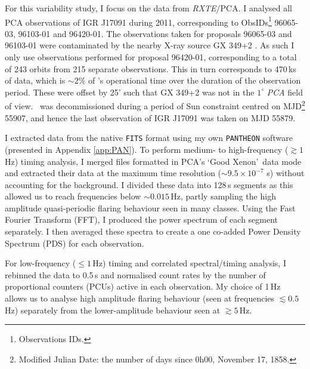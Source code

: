 \par For this variability study, I focus on the data from \indexrxte\indexpca\textit{RXTE}/PCA.  I analysed all PCA observations of IGR J17091 during 2011, corresponding to ObsIDs\footnote{Observations IDs.} 96065-03, 96103-01 and 96420-01.  The observations taken for proposals 96065-03 and 96103-01 were contaminated by the nearby X-ray source GX 349+2 \citep{Altamirano_IGR_FH,Rodriguez_Contamination}.  As such I only use observations performed for proposal 96420-01, corresponding to a total of 243 orbits from 215 separate observations.  This in turn corresponds to 470\,ks of data, which is $\sim2$\% of \rxte 's operational time over the duration of the observation period.  These were offset by 25' such that GX 349+2 was not in the $1^\circ$ \textit{PCA} field of view.  \rxte\ was decommissioned during a period of Sun constraint centred on MJD\footnote{Modified Julian Date: the number of days since 0h00, November 17, 1858.} 55907, and hence the last observation of IGR J17091 was taken on MJD 55879.
\par I extracted data from the native \texttt{FITS} format using my own \texttt{PANTHEON} software (presented in Appendix \ref{app:PAN}).  To perform medium- to high-frequency ($\gtrsim1$\,Hz) timing analysis, I merged files formatted in PCA's `Good Xenon'\indexgx\ data mode and extracted their data at the maximum time resolution ($\sim9.5\times10^{-7}$ s) without accounting for the background.  I divided these data into 128\,s segments as this allowed us to reach frequencies below $\sim0.015$\,Hz, partly sampling the high amplitude quasi-periodic flaring behaviour seen in many classes.  Using the Fast Fourier Transform (FFT), I produced the power spectrum of each segment separately.  I then averaged these spectra to create a one co-added Power Density Spectrum (PDS) for each observation.
\par For low-frequency ($\leq1$\,Hz) timing and correlated spectral/timing analysis, I rebinned the data to 0.5\,s and normalised count rates by the number of proportional counters (PCUs) active in each observation.  My choice of 1\,Hz allows us to analyse high amplitude flaring behaviour (seen at frequencies $\lesssim0.5$\,Hz) separately from the lower-amplitude behaviour seen at $\gtrsim5$\,Hz.
